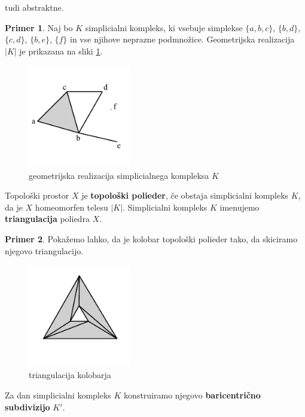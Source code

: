 \documentclass[a4paper, 12pt]{book}
\theoremstyle{definition}
\newtheorem{example}{Primer}[section]
\theoremstyle{remark}
\begin{document}
tudi abstraktne.
\newpage
\begin{example}
  Naj bo $K$ simplicialni kompleks, ki vsebuje simplekse
  $\{a,b,c\}$, $\{b,d\}$, $\{c,d\}$, $\{b,e\}$, $\{f\}$ in vse njihove neprazne
  podmnožice.
  Geometrijska realizacija $|K|$ je prikazana na sliki \ref{sx}.
  \begin{figure}[h]
      \begin{center}
      \includegraphics[width=0.4\textwidth]{simplicialni-kompleks.pdf}
      \end{center}
      \caption{geometrijska realizacija simplicialnega kompleksa $K$}
      \label{sx}
  \end{figure}
\end{example}
\newpage
Topološki prostor $X$ je \textbf{topološki polieder}, če obstaja simplicialni
kompleks $K$, da je $X$ homeomorfen telesu $|K|$. Simplicialni kompleks
$K$ imenujemo \textbf{triangulacija} poliedra $X$.
\begin{example}
  Pokažemo lahko, da je kolobar topološki polieder tako, da skiciramo njegovo
  triangulacijo.
    \begin{figure}[h]
        \begin{center}
        \includegraphics[width=0.4\textwidth]{torus-simpleks.pdf}
        \end{center}
        \caption{triangulacija kolobarja}
    \end{figure}
\end{example}
Za dan simplicialni kompleks $K$ konstruiramo njegovo \textbf{baricentrično subdivizijo} $K'$.
\end{document}
